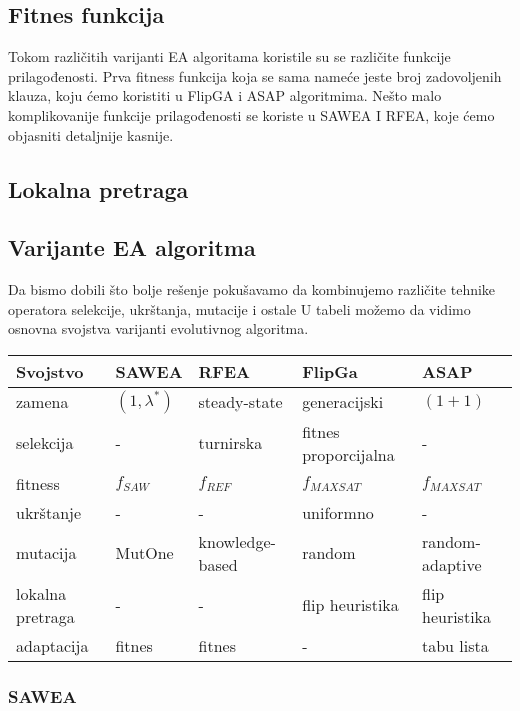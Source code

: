 \documentclass{article}
\begin{document}
\subsection{Fitnes funkcija}
Tokom različitih varijanti EA algoritama koristile su se različite funkcije prilagođenosti. Prva fitness funkcija koja se sama nameće jeste broj zadovoljenih klauza, koju ćemo koristiti u FlipGA i ASAP algoritmima. Nešto malo komplikovanije funkcije prilagođenosti se koriste u SAWEA I RFEA, koje ćemo objasniti detaljnije kasnije.

\subsection{Lokalna pretraga}

\subsection{Varijante EA algoritma}
Da bismo dobili što bolje rešenje pokušavamo da kombinujemo različite tehnike operatora selekcije, ukrštanja, mutacije i ostale U tabeli možemo da vidimo osnovna svojstva varijanti evolutivnog algoritma.
 
\begin{table}[h!]
\centering
{}\label{tab:EA} 
\begin{tabular}{ |p{3cm}|p{2cm}|p{2cm}|p{2cm}|p{2cm}|}
 \hline
 Svojstvo & SAWEA & RFEA & FlipGa & ASAP \\
 \hline
 zamena & $(1, \lambda^*)$ & steady-state & generacijski & $(1 + 1)$ \\
 \hline
 selekcija & - & turnirska & fitnes proporcijalna & - \\
 \hline
 fitness &	$f_{SAW}$ & $f_{REF}$ & $f_{MAXSAT}$ & $f_{MAXSAT}$ \\
 \hline
 ukrštanje & - & - & uniformno & - \\
 \hline
 mutacija & MutOne & knowledge-based & random & random-adaptive \\
 \hline
 lokalna pretraga & - & - & flip heuristika & flip heuristika \\
 \hline
 adaptacija & fitnes & fitnes &  - & tabu lista \\
 \hline
\end{tabular}
\end{table}


\subsubsection{SAWEA}
\end{document}
